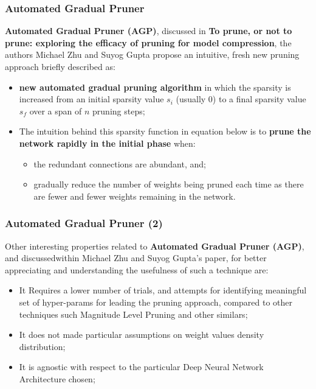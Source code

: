 



\begin{frame}
\frametitle{Automated Gradual Pruner}
\textbf{Automated Gradual Pruner (AGP)}, discussed in \textbf{To prune, or not to prune: exploring the efficacy of pruning for model compression}, the authors Michael Zhu and Suyog Gupta propose an intuitive, fresh new pruning approach briefly described as:

\begin{itemize}
\item \textbf{new automated gradual pruning algorithm} in which the sparsity is increased from an initial sparsity value $s_{i}$ (usually 0) to a ﬁnal sparsity value $s_{f}$ over a span of $n$ pruning steps;
\item The intuition behind this sparsity function in equation below is to \textbf{prune the network rapidly in the initial phase} when:
\begin{itemize}
\item the redundant connections are abundant, and;
\item gradually reduce the number of weights being pruned each time as there are fewer and fewer weights remaining in the network.
\end{itemize}
\end{itemize}



\end{frame}

\begin{frame}
\frametitle{Automated Gradual Pruner (2)}
Other interesting properties related to \textbf{Automated Gradual Pruner (AGP)}, and discussedwithin Michael Zhu and Suyog Gupta's paper, for better appreciating and understanding the usefulness of such a technique are:

\begin{itemize}
\item It Requires a lower number of trials, and attempts for identifying meaningful set of hyper-params for leading the pruning approach, compared to other techniques such Magnitude Level Pruning and other similars;
\item It does not made particular assumptions on weight values density distribution;
\item It is agnostic with respect to the particular Deep Neural Network Architecture chosen;
\end{itemize}



\end{frame}
